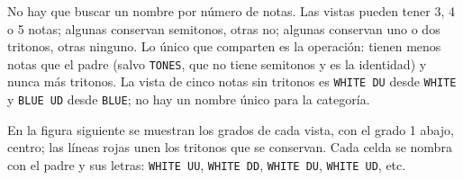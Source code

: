 \documentclass[]{report}
\begin{document}
No hay que buscar un nombre por número de notas. Las vistas pueden tener 3, 4 o
5 notas; algunas conservan semitonos, otras no; algunas conservan uno o dos
tritonos, otras ninguno. Lo único que comparten es la operación: tienen menos
notas que el padre (salvo \texttt{TONES}, que no tiene semitonos y es la
identidad) y nunca más tritonos. La vista de cinco notas sin tritonos es
\texttt{WHITE DU} desde \texttt{WHITE} y \texttt{BLUE UD} desde \texttt{BLUE};
no hay un nombre único para la categoría.

En la figura siguiente se muestran los grados de cada vista, con el grado 1
abajo, centro; las líneas rojas unen los tritonos que se conservan. Cada celda
se nombra con el padre y sus letras: \texttt{WHITE UU}, \texttt{WHITE DD},
\texttt{WHITE DU}, \texttt{WHITE UD}, etc.

\newcommand{\collapseviewcoord}[1]{%
	\ifcase#1
		0.5,0\or0,0\or0,0.5\or0,1\or0,1.5\or0,2%
		\or0.5,2\or1,2\or1,1.5\or1,1\or1,0.5\or1,0%
	\fi}

\newcommand{\collapseviewbody}[1]{%
	\foreach \val [count=\i from 0] in {#1} {
		\ifnum\val=0
			\node at (\collapseviewcoord{\i}) [st=white] {};
		\else
			\node at (\collapseviewcoord{\i}) [st] {\val};
		\fi
	}}

\newcommand{\collapseviewx}[1]{%
	\ifcase#1 0.5\or0\or0\or0\or0\or0\or0.5\or1\or1\or1\or1\or1\fi}
\newcommand{\collapseviewy}[1]{%
	\ifcase#1 0\or0\or0.5\or1\or1.5\or2\or2\or2\or1.5\or1\or0.5\or0\fi}

\newcommand{\collapseviewtritones}[1]{%
	\foreach \a/\b in {#1} {
		\pgfmathsetmacro{\ax}{\collapseviewx{\a}}
		\pgfmathsetmacro{\ay}{\collapseviewy{\a}}
		\pgfmathsetmacro{\bx}{\collapseviewx{\b}}
		\pgfmathsetmacro{\by}{\collapseviewy{\b}}
		\ifdim\ax pt=\bx pt
			\draw[very thick, color=red]
				(\ax,\ay+0.25) -- (\bx,\by-0.25);
		\else
			\draw[very thick, color=red]
				(\ax+0.25,\ay) -- (\bx-0.25,\by);
		\fi
	}}

\newcommand{\collapseviewgrid}[4]{%
	\begin{scope}[shift={(#1,#2)}]
		\collapseviewbody{#3}
		\collapseviewtritones{#4}
	\end{scope}}
\end{document}
